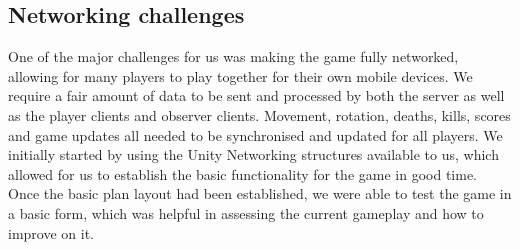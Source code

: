 \documentclass[11pt,a4paper]{article}
\begin{document}
 \subsection{Networking challenges}
  
  \noindent

  One of the major challenges for us was making the game fully networked, allowing for many players to play together for their own mobile devices. We require a fair amount of data to be sent and processed by both the server as well as the player clients and observer clients. Movement, rotation, deaths, kills, scores and game updates all needed to be synchronised and updated for all players. We initially started by using the Unity Networking structures available to us, which allowed for us to establish the basic functionality for the game in good time. Once the basic plan layout had been established, we were able to test the game in a basic form, which was helpful in assessing the current gameplay and how to improve on it. \\
\end{document}
